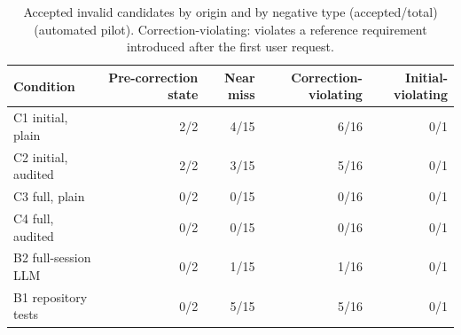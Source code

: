 \begin{table}[t]\centering\footnotesize
\caption{Accepted invalid candidates by origin and by negative type (accepted/total) (automated pilot). Correction-violating: violates a reference requirement introduced after the first user request.}\label{tab:negatives}
\begin{tabular}{lrrrr}\toprule Condition & Pre-correction state & Near miss & Correction-violating & Initial-violating \\\midrule
C1 initial, plain & 2/2 & 4/15 & 6/16 & 0/1 \\
C2 initial, audited & 2/2 & 3/15 & 5/16 & 0/1 \\
C3 full, plain & 0/2 & 0/15 & 0/16 & 0/1 \\
C4 full, audited & 0/2 & 0/15 & 0/16 & 0/1 \\
B2 full-session LLM & 0/2 & 1/15 & 1/16 & 0/1 \\
B1 repository tests & 0/2 & 5/15 & 5/16 & 0/1 \\
\bottomrule\end{tabular}\end{table}

